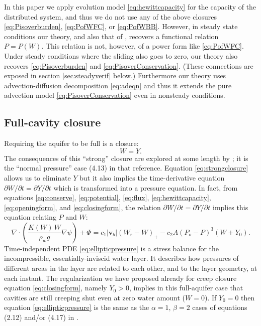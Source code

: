 \documentclass[11pt,final]{amsart}%
\newcommand\bv{\mathbf{v}}
\newcommand{\Div}{\nabla\cdot}
\newcommand{\grad}{\nabla}
\begin{document}
In this paper we apply evolution model \eqref{eq:hewittcapacity} for the capacity of the distributed system, and thus we do not use any of the above closures \eqref{eq:Pisoverburden}, \eqref{eq:PofWFC}, or \eqref{eq:PofWBB}.  However, in steady state conditions our theory, and also that of \cite{Schoofetal2012}, recovers a functional relation $P=P(W)$.  This relation is not, however, of a power form like \eqref{eq:PofWFC}.  Under steady conditions where the sliding also goes to zero, our theory also recovers \eqref{eq:Pisoverburden} and \eqref{eq:PisoverConservation}.  (These connections are exposed in section \ref{sec:steadyverif} below.)  Furthermore our theory uses advection-diffusion decomposition \eqref{eq:adeqn} and thus it extends the pure advection model \eqref{eq:PisoverConservation} even in nonsteady conditions.

\subsection*{Full-cavity closure}  Requiring the aquifer to be full is a closure:
\begin{equation}
W = Y.\label{eq:strongclosure}
\end{equation}
The consequences of this ``strong'' closure are explored at some length by \cite{Schoofetal2012}; it is the ``normal pressure'' case (4.13) in that reference.  Equation \eqref{eq:strongclosure} allows us to eliminate $Y$ but it also implies the time-derivative equation $\partial W/\partial t = \partial Y/\partial t$ which is transformed into a pressure equation.  In fact, from equations \eqref{eq:conserve}, \eqref{eq:potential}, \eqref{eq:flux}, \eqref{eq:hewittcapacity}, \eqref{eq:openingform}, and \eqref{eq:closingform}, the relation $\partial W/\partial t = \partial Y/\partial t$ implies this equation relating $P$ and $W$:
\begin{equation}
\Div \left(\frac{K(W)\,W}{\rho_w g} \grad \psi \right) + \Phi = c_1 |\bv_b| (W_r - W)_+ - c_2 A (P_o - P)^3 (W+Y_0).\label{eq:ellipticpressure}
\end{equation}
Time-independent PDE \eqref{eq:ellipticpressure} is a stress balance for the incompressible, essentially-inviscid water layer.  It describes how pressures of different areas in the layer are related to each other, and to the layer geometry, at each instant.  The regularization we have proposed already for creep closure equation \eqref{eq:closingform}, namely $Y_0>0$, implies in this full-aquifer case that cavities are still creeping shut even at zero water amount ($W=0$).  If $Y_0=0$ then equation \eqref{eq:ellipticpressure} is the same as the $\alpha=1$, $\beta=2$ cases of equations (2.12) and/or (4.17) in \citep{Schoofetal2012}.
\end{document}
